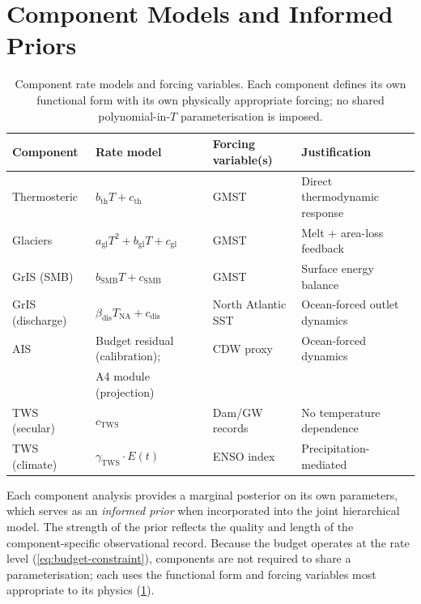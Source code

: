 \documentclass[11pt]{article}
\begin{document}
\section{Component Models and Informed Priors}
\label{sec:components}

\begin{table}[ht]
\centering
\caption{Component rate models and forcing variables.  Each component defines its own functional form with its own physically appropriate forcing; no shared polynomial-in-$T$ parameterisation is imposed.}
\label{tab:component-models}
\begin{tabular}{llll}
\toprule
Component & Rate model & Forcing variable(s) & Justification \\
\midrule
Thermosteric & $b_{\text{th}} T + c_{\text{th}}$ & GMST & Direct thermodynamic response \\
Glaciers & $a_{\text{gl}} T^2 + b_{\text{gl}} T + c_{\text{gl}}$ & GMST & Melt + area-loss feedback \\
GrIS (SMB) & $b_{\text{SMB}} T + c_{\text{SMB}}$ & GMST & Surface energy balance \\
GrIS (discharge) & $\beta_{\text{dis}} T_{\text{NA}} + c_{\text{dis}}$ & North Atlantic SST & Ocean-forced outlet dynamics \\
AIS & Budget residual (calibration); & CDW proxy & Ocean-forced dynamics \\
    & A4 module (projection) & & \\
TWS (secular) & $c_{\text{TWS}}$ & Dam/GW records & No temperature dependence \\
TWS (climate) & $\gamma_{\text{TWS}} \cdot E(t)$ & ENSO index & Precipitation-mediated \\
\bottomrule
\end{tabular}
\end{table}

Each component analysis provides a marginal posterior on its own parameters, which serves as an \emph{informed prior} when incorporated into the joint hierarchical model.  The strength of the prior reflects the quality and length of the component-specific observational record.  Because the budget operates at the rate level (\cref{eq:budget-constraint}), components are not required to share a parameterisation; each uses the functional form and forcing variables most appropriate to its physics (\cref{tab:component-models}).
\end{document}
